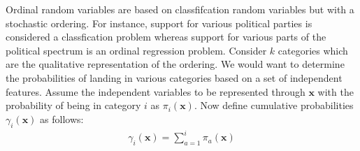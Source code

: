 \documentclass[a4paper, 11pt]{article}
\begin{document}



Ordinal random variables are based on classfifcation random variables but with a stochastic ordering. For instance, support for various political parties is considered a classfication problem whereas support for various parts of the political spectrum is an ordinal regression problem.
Consider $k$ categories which are the qualitative representation of the ordering. We would want to determine the probabilities of landing in various categories based on a set of independent features.
\newline
Assume the independent variables to be represented through $\textbf{x}$ with the probability of being in category $i$ as $\pi_i(\textbf{x})$. Now define cumulative probabilities $\gamma_i(\textbf{x})$ as follows: \newline
\begin{align}
    \gamma_i(\textbf{x}) = \sum_{a=1}^{i} \pi_a(\textbf{x})
\end{align}
\end{document}
